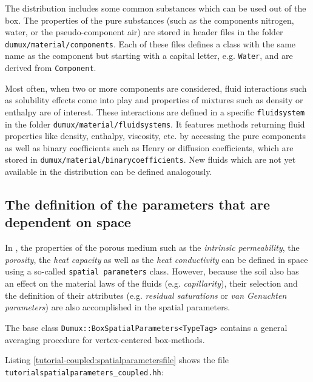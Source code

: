 The \Dumux distribution includes some common substances which can be used
out of the box. The properties of the pure substances (such as the components 
nitrogen, water, or the pseudo-component air) are stored in header files in 
the folder \verb+dumux/material/components+. Each of these files 
defines a class with the same name as the component but starting with a capital
letter, e.g. \texttt{Water}, and are derived from \texttt{Component}.

Most often, when two or more components are considered, fluid interactions 
such as solubility effects come into play and properties of mixtures such as 
density or enthalpy are of interest. These interactions are defined in
a specific \verb+fluidsystem+ in the folder \verb+dumux/material/fluidsystems+.
It features methods returning fluid properties like density, enthalpy, viscosity,
etc. by accessing the pure components as well as binary coefficients such as
Henry or diffusion coefficients, which are stored in 
\verb+dumux/material/binarycoefficients+. New fluids which are not yet
 available in the \Dumux distribution can be defined analogously.


\subsection{The definition of the parameters that are dependent on space}\label{tutorial-coupled:description-spatialParameters}

In \Dumux, the properties of the porous medium such as the \textit{intrinsic 
permeability}, the \textit{porosity}, the \textit{heat capacity} as
well as the \textit{heat conductivity} can be defined in space using a
so-called \texttt{spatial parameters} class.  However, because the soil
also has an effect on the material laws of the fluids (e.g. \textit{capillarity}),
their selection and the definition of their attributes (e.g. \textit{residual 
saturations} or \textit{van Genuchten parameters}) are also accomplished in the spatial parameters.

The base class \texttt{Dumux::BoxSpatialParameters<TypeTag>} contains a general 
averaging procedure for vertex-centered box-methods.

Listing \ref{tutorial-coupled:spatialparametersfile} shows the file
\verb+tutorialspatialparameters_coupled.hh+:

